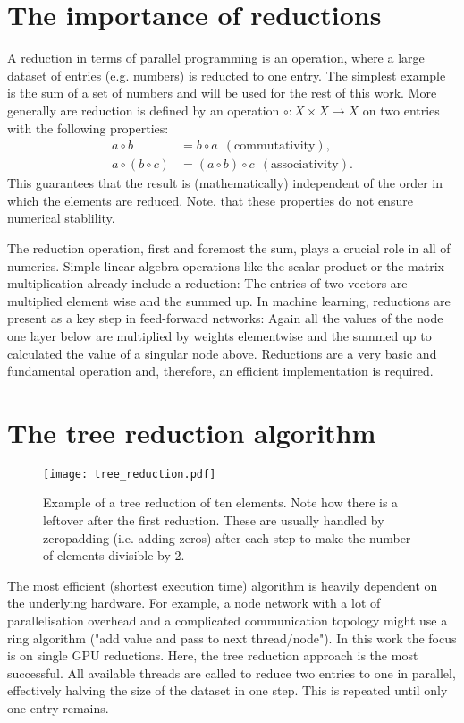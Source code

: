 \section{The importance of reductions}
A reduction in terms of parallel programming is an operation, where a large dataset of entries (e.g. numbers) is reducted to one entry.
The simplest example is the sum of a set of numbers and will be used for the rest of this work.
More generally are reduction is defined by an operation \( \circ: X \times X \rightarrow X \) on two entries with the following properties:
\begin{align}
    a \circ b &= b \circ a \ \ \mathrm{(commutativity)}, \\
    a \circ (b \circ c) &= (a \circ b) \circ c \ \ \mathrm{(associativity)}.
\end{align}
This guarantees that the result is (mathematically) independent of the order in which the elements are reduced.
Note, that these properties do not ensure numerical stablility.

The reduction operation, first and foremost the sum, plays a crucial role in all of numerics.
Simple linear algebra operations like the scalar product or the matrix multiplication already include a reduction:
The entries of two vectors are multiplied element wise and the summed up.
In machine learning, reductions are present as a key step in feed-forward networks:
Again all the values of the node one layer below are multiplied by weights elementwise and the summed up to calculated the value of a singular node above.
Reductions are a very basic and fundamental operation and, therefore, an efficient implementation is required. 

\section{The tree reduction algorithm}
\begin{figure}
    \centering
    \texttt{[image: tree\_reduction.pdf]}
    \caption{
        Example of a tree reduction of ten elements.
        Note how there is a leftover after the first reduction.
        These are usually handled by zeropadding (i.e. adding zeros) after each step to make the number of elements divisible by 2.
    }
\end{figure}
The most efficient (shortest execution time) algorithm is heavily dependent on the underlying hardware.
For example, a node network with a lot of parallelisation overhead and a complicated communication topology might use a ring algorithm ("add value and pass to next thread/node").
In this work the focus is on single GPU reductions.
Here, the tree reduction approach is the most successful.
All available threads are called to reduce two entries to one in parallel, effectively halving the size of the dataset in one step.
This is repeated until only one entry remains.

